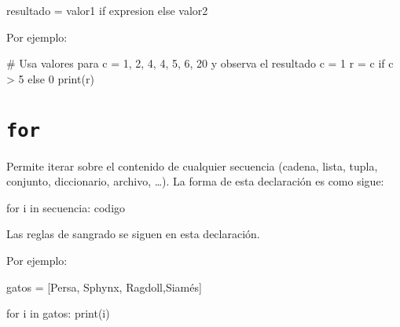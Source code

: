\documentclass[
  letterpaper,
  DIV=11,
  numbers=noendperiod]{scrreprt}
\newenvironment{Shaded}{\begin{snugshade}}{\end{snugshade}}
\newcommand{\BuiltInTok}[1]{\textcolor[rgb]{0.00,0.23,0.31}{#1}}
\newcommand{\CommentTok}[1]{\textcolor[rgb]{0.37,0.37,0.37}{#1}}
\newcommand{\ControlFlowTok}[1]{\textcolor[rgb]{0.00,0.23,0.31}{#1}}
\newcommand{\DecValTok}[1]{\textcolor[rgb]{0.68,0.00,0.00}{#1}}
\newcommand{\KeywordTok}[1]{\textcolor[rgb]{0.00,0.23,0.31}{#1}}
\newcommand{\NormalTok}[1]{\textcolor[rgb]{0.00,0.23,0.31}{#1}}
\newcommand{\OperatorTok}[1]{\textcolor[rgb]{0.37,0.37,0.37}{#1}}
\newcommand{\StringTok}[1]{\textcolor[rgb]{0.13,0.47,0.30}{#1}}
\begin{document}
\begin{Shaded}
\begin{Highlighting}[]
\NormalTok{resultado }\OperatorTok{=}\NormalTok{ valor1 }\ControlFlowTok{if}\NormalTok{ expresion }\ControlFlowTok{else}\NormalTok{ valor2}
\end{Highlighting}
\end{Shaded}

Por ejemplo:

\begin{Shaded}
\begin{Highlighting}[]
\CommentTok{\# Usa valores para c = 1, 2, 4, 4, 5, 6, 20 y observa el resultado}
\NormalTok{c }\OperatorTok{=} \DecValTok{1}
\NormalTok{r }\OperatorTok{=}\NormalTok{ c }\ControlFlowTok{if}\NormalTok{ c }\OperatorTok{\textgreater{}} \DecValTok{5} \ControlFlowTok{else} \DecValTok{0}
\BuiltInTok{print}\NormalTok{(r)}
\end{Highlighting}
\end{Shaded}


\chapter{\texorpdfstring{\texttt{for}}{for}}\label{for}

Permite iterar sobre el contenido de cualquier secuencia (cadena, lista,
tupla, conjunto, diccionario, archivo, \ldots). La forma de esta
declaración es como sigue:

\begin{Shaded}
\begin{Highlighting}[]
\ControlFlowTok{for}\NormalTok{ i }\KeywordTok{in}\NormalTok{ secuencia:}
\NormalTok{    codigo}
\end{Highlighting}
\end{Shaded}

Las reglas de sangrado se siguen en esta declaración.

Por ejemplo:

\begin{Shaded}
\begin{Highlighting}[]
\NormalTok{gatos }\OperatorTok{=}\NormalTok{ [}\StringTok{\textquotesingle{}Persa\textquotesingle{}}\NormalTok{, }\StringTok{\textquotesingle{}Sphynx\textquotesingle{}}\NormalTok{, }\StringTok{\textquotesingle{}Ragdoll\textquotesingle{}}\NormalTok{,}\StringTok{\textquotesingle{}Siamés\textquotesingle{}}\NormalTok{]}

\ControlFlowTok{for}\NormalTok{ i }\KeywordTok{in}\NormalTok{ gatos:}
    \BuiltInTok{print}\NormalTok{(i)}
\end{Highlighting}
\end{Shaded}
\end{document}
